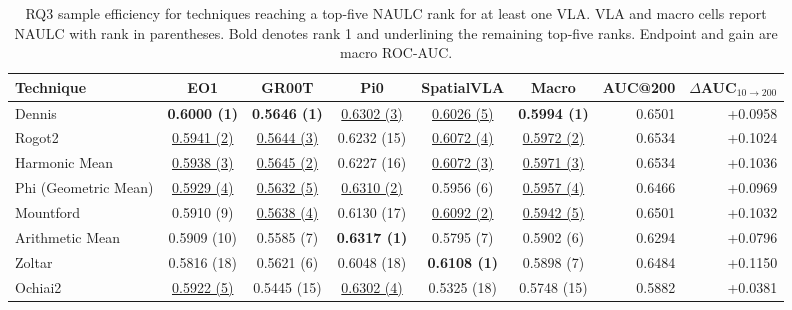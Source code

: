 \begin{table}[t]
\centering
\caption{RQ3 sample efficiency for techniques reaching a top-five NAULC rank for at least one VLA. VLA and macro cells report NAULC with rank in parentheses. Bold denotes rank 1 and underlining the remaining top-five ranks. Endpoint and gain are macro ROC-AUC.}
\label{tab:rq3v2-sample-efficiency}
{\scriptsize
\setlength{\tabcolsep}{3.5pt}
\begin{tabular}{lcccccrr}
\toprule
Technique & EO1 & GR00T & Pi0 & SpatialVLA & Macro & AUC@200 & $\Delta$AUC$_{10\rightarrow200}$ \\
\midrule
Dennis & \textbf{0.6000 (1)} & \textbf{0.5646 (1)} & \underline{0.6302 (3)} & \underline{0.6026 (5)} & \textbf{0.5994 (1)} & 0.6501 & +0.0958 \\
Rogot2 & \underline{0.5941 (2)} & \underline{0.5644 (3)} & 0.6232 (15) & \underline{0.6072 (4)} & \underline{0.5972 (2)} & 0.6534 & +0.1024 \\
Harmonic Mean & \underline{0.5938 (3)} & \underline{0.5645 (2)} & 0.6227 (16) & \underline{0.6072 (3)} & \underline{0.5971 (3)} & 0.6534 & +0.1036 \\
Phi (Geometric Mean) & \underline{0.5929 (4)} & \underline{0.5632 (5)} & \underline{0.6310 (2)} & 0.5956 (6) & \underline{0.5957 (4)} & 0.6466 & +0.0969 \\
Mountford & 0.5910 (9) & \underline{0.5638 (4)} & 0.6130 (17) & \underline{0.6092 (2)} & \underline{0.5942 (5)} & 0.6501 & +0.1032 \\
Arithmetic Mean & 0.5909 (10) & 0.5585 (7) & \textbf{0.6317 (1)} & 0.5795 (7) & 0.5902 (6) & 0.6294 & +0.0796 \\
Zoltar & 0.5816 (18) & 0.5621 (6) & 0.6048 (18) & \textbf{0.6108 (1)} & 0.5898 (7) & 0.6484 & +0.1150 \\
Ochiai2 & \underline{0.5922 (5)} & 0.5445 (15) & \underline{0.6302 (4)} & 0.5325 (18) & 0.5748 (15) & 0.5882 & +0.0381 \\
\bottomrule
\end{tabular}
}
\end{table}
